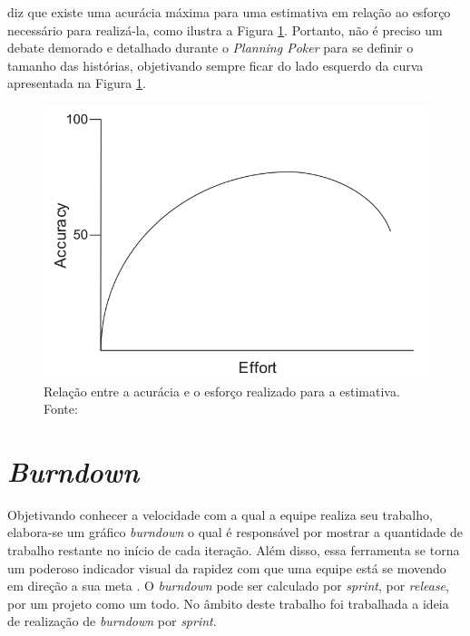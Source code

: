      diz que existe uma acurácia máxima para uma estimativa
    em relação ao esforço necessário para realizá-la, como ilustra a Figura \ref{fig:effort_accuracy}.
    Portanto, não é preciso um debate demorado e detalhado durante o \textit{Planning Poker} para se definir
    o tamanho das histórias, objetivando sempre ficar do lado esquerdo da curva apresentada na Figura \ref{fig:effort_accuracy}.



    \begin{figure}[!htb]
      \centering
      \includegraphics[scale=0.4]{figuras/effort_accuracy}
      \caption[Relação entre a acurácia e o esforço realizado para a estimativa.]
	      {Relação entre a acurácia e o esforço realizado para a estimativa. Fonte: \cite{cohn06}}
      \label{fig:effort_accuracy}
    \end{figure}

\section{\textit{Burndown}}

    Objetivando conhecer a velocidade com a qual a equipe realiza seu trabalho, elabora-se um gráfico \textit{burndown} o qual é responsável por mostrar a quantidade de trabalho restante no início de cada iteração. Além disso, essa ferramenta se torna um poderoso indicador visual da rapidez com que uma equipe está se movendo em direção a sua meta \cite{cohn06}. O \textit{burndown} pode ser calculado por \textit{sprint}, por \textit{release}, por um projeto como um todo. No âmbito deste trabalho foi trabalhada a ideia de realização de \textit{burndown} por \textit{sprint}.

